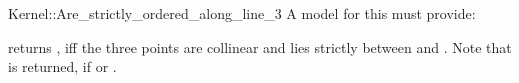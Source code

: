 \begin{ccRefFunctionObjectConcept}{Kernel::Are_strictly_ordered_along_line_3}
A model for this must provide:


          {returns , iff the three points are collinear and 
           lies strictly between  and .
          Note that  is returned, if  or
          .}
\end{ccRefFunctionObjectConcept}         

